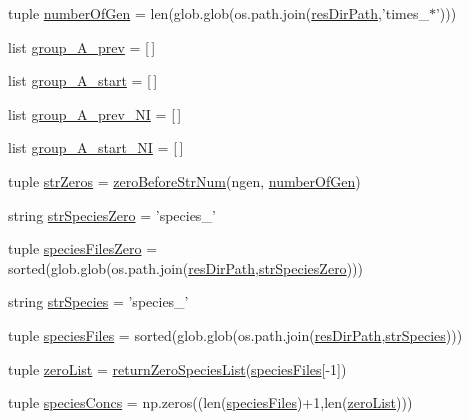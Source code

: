 \begin{DoxyCompactItemize}
\item 
tuple \hyperlink{a00104_a54acb4eba0735e72c2a820383febd37f}{number\-Of\-Gen} = len(glob.\-glob(os.\-path.\-join(\hyperlink{a00104_ab3da7da39258338965b6eef645a913ee}{res\-Dir\-Path},'times\-\_\-$\ast$')))
\item 
list \hyperlink{a00104_a1dd2f2c85f697e454c99be1a157d6c17}{group\-\_\-\-A\-\_\-prev} = \mbox{[}$\,$\mbox{]}
\item 
list \hyperlink{a00104_a3898175300d001a17a60c23656d2812f}{group\-\_\-\-A\-\_\-start} = \mbox{[}$\,$\mbox{]}
\item 
list \hyperlink{a00104_a4d77133a6a303d9486944707f3310cf8}{group\-\_\-\-A\-\_\-prev\-\_\-\-N\-I} = \mbox{[}$\,$\mbox{]}
\item 
list \hyperlink{a00104_aedb746884c5ae6e301c8ad2d8307fe4d}{group\-\_\-\-A\-\_\-start\-\_\-\-N\-I} = \mbox{[}$\,$\mbox{]}
\item 
tuple \hyperlink{a00104_a292c23aa303304f24632662a5dfbfa23}{str\-Zeros} = \hyperlink{a00104_aeeb6d629132a9755b45a3008d445419c}{zero\-Before\-Str\-Num}(ngen, \hyperlink{a00104_a54acb4eba0735e72c2a820383febd37f}{number\-Of\-Gen})
\item 
string \hyperlink{a00104_a52f7239b2be2cb978182547960b6c46e}{str\-Species\-Zero} = 'species\-\_\-'
\item 
tuple \hyperlink{a00104_a5584994da277e7798c904342dff18427}{species\-Files\-Zero} = sorted(glob.\-glob(os.\-path.\-join(\hyperlink{a00104_ab3da7da39258338965b6eef645a913ee}{res\-Dir\-Path},\hyperlink{a00104_a52f7239b2be2cb978182547960b6c46e}{str\-Species\-Zero})))
\item 
string \hyperlink{a00104_ab14d209fe558e83aeede3b657a7241bb}{str\-Species} = 'species\-\_\-'
\item 
tuple \hyperlink{a00104_af3291bd263282353dd4a12ee38c08cae}{species\-Files} = sorted(glob.\-glob(os.\-path.\-join(\hyperlink{a00104_ab3da7da39258338965b6eef645a913ee}{res\-Dir\-Path},\hyperlink{a00104_ab14d209fe558e83aeede3b657a7241bb}{str\-Species})))
\item 
tuple \hyperlink{a00104_ac2f9e6ead14745bd749a1ab8060cd4e7}{zero\-List} = \hyperlink{a00104_ad7c75c1e146fa51da42274cf7d5747d0}{return\-Zero\-Species\-List}(\hyperlink{a00104_af3291bd263282353dd4a12ee38c08cae}{species\-Files}\mbox{[}-\/1\mbox{]})
\item 
tuple \hyperlink{a00104_a2377568425051a7511b51f7c50662ba1}{species\-Concs} = np.\-zeros((len(\hyperlink{a00104_af3291bd263282353dd4a12ee38c08cae}{species\-Files})+1,len(\hyperlink{a00104_ac2f9e6ead14745bd749a1ab8060cd4e7}{zero\-List})))

\end{DoxyCompactItemize}
